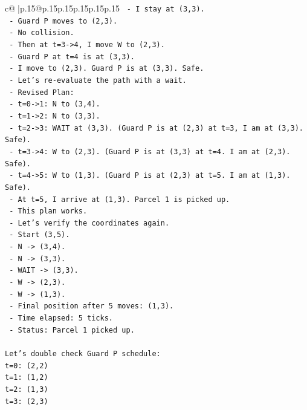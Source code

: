 \documentclass{article}
\begin{document}
{\begin{supertabular}{c@{$\;$}|p{.15\linewidth}@{}p{.15\linewidth}p{.15\linewidth}p{.15\linewidth}p{.15\linewidth}p{.15\linewidth}}
{{{\texttt{      {-} I stay at (3,3).} \\
\texttt{      {-} Guard P moves to (2,3).} \\
\texttt{      {-} No collision.} \\
\texttt{      {-} Then at t=3{-}>4, I move W to (2,3).} \\
\texttt{        {-} Guard P at t=4 is at (3,3).} \\
\texttt{        {-} I move to (2,3). Guard P is at (3,3). Safe.} \\
\texttt{  {-} Let's re{-}evaluate the path with a wait.} \\
\texttt{  {-} Revised Plan:} \\
\texttt{    {-} t=0{-}>1: N to (3,4).} \\
\texttt{    {-} t=1{-}>2: N to (3,3).} \\
\texttt{    {-} t=2{-}>3: WAIT at (3,3). (Guard P is at (2,3) at t=3, I am at (3,3). Safe).} \\
\texttt{    {-} t=3{-}>4: W to (2,3). (Guard P is at (3,3) at t=4. I am at (2,3). Safe).} \\
\texttt{    {-} t=4{-}>5: W to (1,3). (Guard P is at (2,3) at t=5. I am at (1,3). Safe).} \\
\texttt{      {-} At t=5, I arrive at (1,3). Parcel 1 is picked up.} \\
\texttt{  {-} This plan works.} \\
\texttt{  {-} Let's verify the coordinates again.} \\
\texttt{    {-} Start (3,5).} \\
\texttt{    {-} N {-}> (3,4).} \\
\texttt{    {-} N {-}> (3,3).} \\
\texttt{    {-} WAIT {-}> (3,3).} \\
\texttt{    {-} W {-}> (2,3).} \\
\texttt{    {-} W {-}> (1,3).} \\
\texttt{  {-} Final position after 5 moves: (1,3).} \\
\texttt{  {-} Time elapsed: 5 ticks.} \\
\texttt{  {-} Status: Parcel 1 picked up.} \\
\\ 
\texttt{Let's double check Guard P schedule:} \\
\texttt{t=0: (2,2)} \\
\texttt{t=1: (1,2)} \\
\texttt{t=2: (1,3)} \\
\texttt{t=3: (2,3)} \\
}}}
\end{supertabular}}
\end{document}
